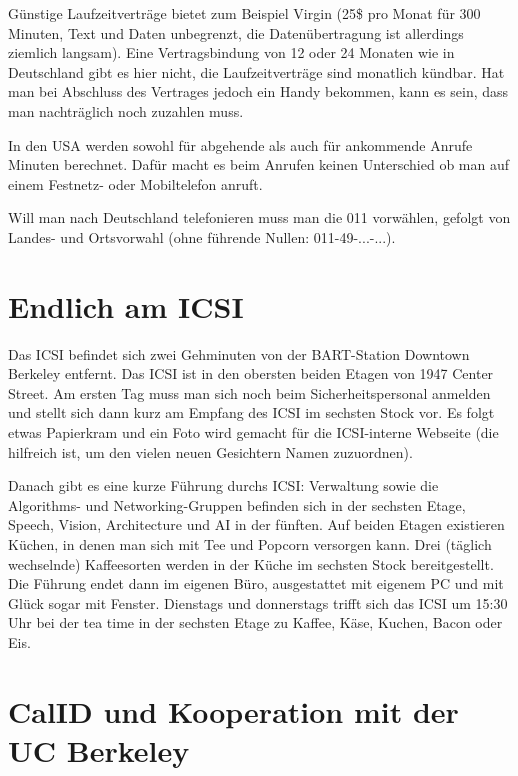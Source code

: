\documentclass[a4paper]{scrreprt}
\begin{document}
Günstige Laufzeitverträge bietet zum Beispiel Virgin (25\$ pro Monat für 300 Minuten, Text und Daten unbegrenzt, die Datenübertragung ist allerdings ziemlich langsam). Eine Vertragsbindung von 12 oder 24 Monaten wie in Deutschland gibt es hier nicht, die Laufzeitverträge sind monatlich kündbar. Hat man bei Abschluss des Vertrages jedoch ein Handy bekommen, kann es sein, dass man nachträglich noch zuzahlen muss.

In den USA werden sowohl für abgehende als auch für ankommende Anrufe Minuten berechnet. Dafür macht es beim Anrufen keinen Unterschied ob man auf einem Festnetz- oder Mobiltelefon anruft.

Will man nach Deutschland telefonieren muss man die 011 vorwählen, gefolgt von Landes- und Ortsvorwahl (ohne führende Nullen: 011-49-...-...).

\section{Endlich am ICSI}

Das ICSI befindet sich zwei Gehminuten von der BART-Station Downtown Berkeley entfernt. Das ICSI ist in den obersten beiden Etagen von 1947 Center Street. Am ersten Tag muss man sich noch beim Sicherheitspersonal anmelden und stellt sich dann kurz am Empfang des ICSI im sechsten Stock vor. Es folgt etwas Papierkram und ein Foto wird gemacht für die ICSI-interne Webseite (die hilfreich ist, um den vielen neuen Gesichtern Namen zuzuordnen).

Danach gibt es eine kurze Führung durchs ICSI: Verwaltung sowie die Algorithms- und Networking-Gruppen befinden sich in der sechsten Etage, Speech, Vision, Architecture und AI in der fünften. Auf beiden Etagen existieren Küchen, in denen man sich mit Tee und Popcorn versorgen kann. Drei (täglich wechselnde) Kaffeesorten werden in der Küche im sechsten Stock bereitgestellt. Die Führung endet dann im eigenen Büro, ausgestattet mit eigenem PC und mit Glück sogar mit Fenster. Dienstags und donnerstags trifft sich das ICSI um 15:30 Uhr bei der tea time in der sechsten Etage zu Kaffee, Käse, Kuchen, Bacon oder Eis.

\section{CalID und Kooperation mit der UC Berkeley}
\end{document}
